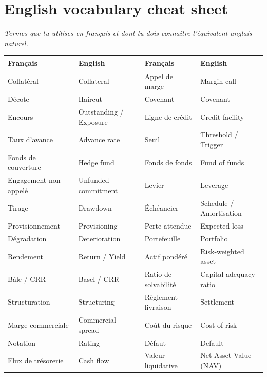 \documentclass[11pt,a4paper]{article}
\begin{document}
\vspace{8pt}

\section{English vocabulary cheat sheet}

\textcolor{warmgray}{\textit{Termes que tu utilises en fran\c{c}ais et dont tu dois conna\^itre
l'\'equivalent anglais naturel.}}

\begin{center}
\small
\begin{tabular}{@{}ll|ll@{}}
\toprule
\textbf{Fran\c{c}ais} & \textbf{English} & \textbf{Fran\c{c}ais} & \textbf{English} \\
\midrule
Collat\'eral & Collateral & Appel de marge & Margin call \\
D\'ecote & Haircut & Covenant & Covenant \\
Encours & Outstanding / Exposure & Ligne de cr\'edit & Credit facility \\
Taux d'avance & Advance rate & Seuil & Threshold / Trigger \\
Fonds de couverture & Hedge fund & Fonds de fonds & Fund of funds \\
Engagement non appel\'e & Unfunded commitment & Levier & Leverage \\
Tirage & Drawdown & \'Ech\'eancier & Schedule / Amortisation \\
Provisionnement & Provisioning & Perte attendue & Expected loss \\
D\'egradation & Deterioration & Portefeuille & Portfolio \\
Rendement & Return / Yield & Actif pond\'er\'e & Risk-weighted asset \\
B\^ale / CRR & Basel / CRR & Ratio de solvabilit\'e & Capital adequacy ratio \\
Structuration & Structuring & R\`eglement-livraison & Settlement \\
Marge commerciale & Commercial spread & Co\^ut du risque & Cost of risk \\
Notation & Rating & D\'efaut & Default \\
Flux de tr\'esorerie & Cash flow & Valeur liquidative & Net Asset Value (NAV) \\
\bottomrule
\end{tabular}
\end{center}
\end{document}
